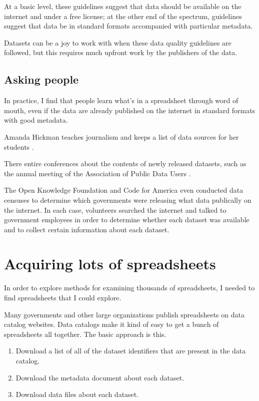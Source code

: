 \documentclass{acm_proc_article-sp}
\begin{document}
At a basic level, these guidelines suggest that data should
be available on the internet and under a free license; at the other
end of the spectrum, guidelines suggest that data be in standard
formats accompanied with particular metadata.

Datasets can be a joy to work with when these data quality guidelines
are followed, but this requires much upfront work by the publishers
of the data.

\subsection{Asking people}
In practice, I find that people learn what's in a spreadsheet through word
of mouth, even if the data are already published on the internet in standard
formats with good metadata.

Amanda Hickman teaches journalism and keeps a list of data sources for her
students \cite{amanda}.

There entire conferences about the contents of newly released datasets,
such as the annual meeting of the Association of Public Data Users \cite{apdu}.

The Open Knowledge Foundation \cite{open-data-census}
and Code for America \cite{open-data-census-us}
even conducted data censuses to determine which governments were
releasing what data publically on the internet.
In each case, volunteers searched the internet and talked to
government employees in order to determine whether each dataset was
available and to collect certain information about each dataset.

\section{Acquiring lots of spreadsheets} \label{acquire}
In order to explore methods for examining thousands of spreadsheets,
I needed to find spreadsheets that I could explore.

Many governments and other large organizations publish spreadsheets on
data catalog websites.
Data catalogs make it kind of easy to get a bunch of spreadsheets all together.
The basic approach is this.

\begin{enumerate}
\item Download a list of all of the dataset identifiers that are present in the data catalog.
\item Download the metadata document about each dataset.
\item Download data files about each dataset.
\end{enumerate}
\end{document}
